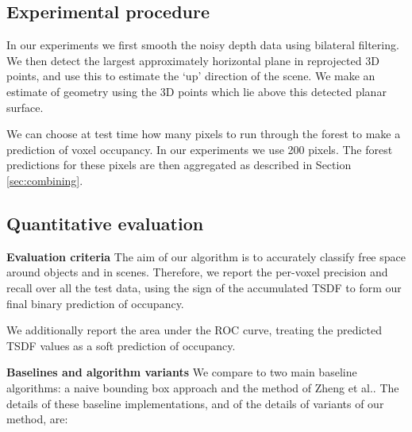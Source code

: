 \documentclass[10pt,twocolumn,letterpaper]{article}
\makeatletter
\newcommand*{\ea}{et al.\@\xspace}
\renewcommand{\paragraph}{\vspace{2pt}\noindent\textbf}
\makeatother
\begin{document}
\subsection{Experimental procedure}

In our experiments we first smooth the noisy depth data using bilateral filtering.
We then detect the largest approximately horizontal plane in reprojected 3D points, and use this to estimate the `up' direction of the scene.
We make an estimate of geometry using the 3D points which lie above this detected planar surface.

We can choose at test time how many pixels to run through the forest to make a prediction of voxel occupancy.
In our experiments we use 200 pixels.
The forest predictions for these pixels are then aggregated as described in Section \ref{sec:combining}.



\subsection{Quantitative evaluation}

\paragraph{Evaluation criteria}
The aim of our algorithm is to accurately classify free space around objects and in scenes.
Therefore, we report the per-voxel precision and recall over all the test data, using the sign of the accumulated TSDF to form our final binary prediction of occupancy.

We additionally report the area under the ROC curve, treating the predicted TSDF values as a soft prediction of occupancy.




\paragraph{Baselines and algorithm variants}
\label{sec:algorithms}
We compare to two main baseline algorithms: a naive bounding box approach and the method of Zheng \ea \cite{zheng-cvpr-2013}.
The details of these baseline implementations, and of the details of variants of our method, are:
\end{document}

